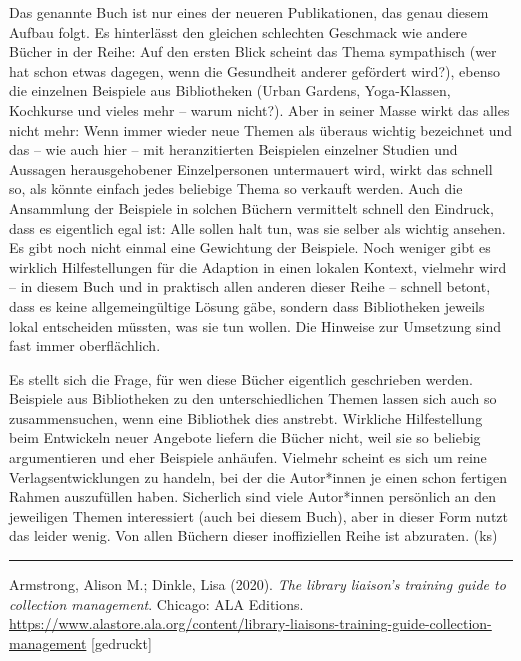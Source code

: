 \documentclass[a4paper,
fontsize=11pt,
oneside,
numbers=noperiodatend,
parskip=half-,
bibliography=totoc,
final
]{scrartcl}
\begin{document}
Das genannte Buch ist nur eines der neueren Publikationen, das genau
diesem Aufbau folgt. Es hinterlässt den gleichen schlechten Geschmack
wie andere Bücher in der Reihe: Auf den ersten Blick scheint das Thema
sympathisch (wer hat schon etwas dagegen, wenn die Gesundheit anderer
gefördert wird?), ebenso die einzelnen Beispiele aus Bibliotheken (Urban
Gardens, Yoga-Klassen, Kochkurse und vieles mehr -- warum nicht?). Aber
in seiner Masse wirkt das alles nicht mehr: Wenn immer wieder neue
Themen als überaus wichtig bezeichnet und das -- wie auch hier -- mit
heranzitierten Beispielen einzelner Studien und Aussagen herausgehobener
Einzelpersonen untermauert wird, wirkt das schnell so, als könnte
einfach jedes beliebige Thema so verkauft werden. Auch die Ansammlung
der Beispiele in solchen Büchern vermittelt schnell den Eindruck, dass
es eigentlich egal ist: Alle sollen halt tun, was sie selber als wichtig
ansehen. Es gibt noch nicht einmal eine Gewichtung der Beispiele. Noch
weniger gibt es wirklich Hilfestellungen für die Adaption in einen
lokalen Kontext, vielmehr wird -- in diesem Buch und in praktisch allen
anderen dieser Reihe -- schnell betont, dass es keine allgemeingültige
Lösung gäbe, sondern dass Bibliotheken jeweils lokal entscheiden
müssten, was sie tun wollen. Die Hinweise zur Umsetzung sind fast immer
oberflächlich.

Es stellt sich die Frage, für wen diese Bücher eigentlich geschrieben
werden. Beispiele aus Bibliotheken zu den unterschiedlichen Themen
lassen sich auch so zusammensuchen, wenn eine Bibliothek dies anstrebt.
Wirkliche Hilfestellung beim Entwickeln neuer Angebote liefern die
Bücher nicht, weil sie so beliebig argumentieren und eher Beispiele
anhäufen. Vielmehr scheint es sich um reine Verlagsentwicklungen zu
handeln, bei der die Autor*innen je einen schon fertigen Rahmen
auszufüllen haben. Sicherlich sind viele Autor*innen persönlich an den
jeweiligen Themen interessiert (auch bei diesem Buch), aber in dieser
Form nutzt das leider wenig. Von allen Büchern dieser inoffiziellen
Reihe ist abzuraten. (ks)

\begin{center}\rule{0.5\linewidth}{0.5pt}\end{center}

Armstrong, Alison M.; Dinkle, Lisa (2020). \emph{The library liaison's
training guide to collection management}. Chicago: ALA Editions.
\url{https://www.alastore.ala.org/content/library-liaisons-training-guide-collection-management}
{[}gedruckt{]}
\end{document}
